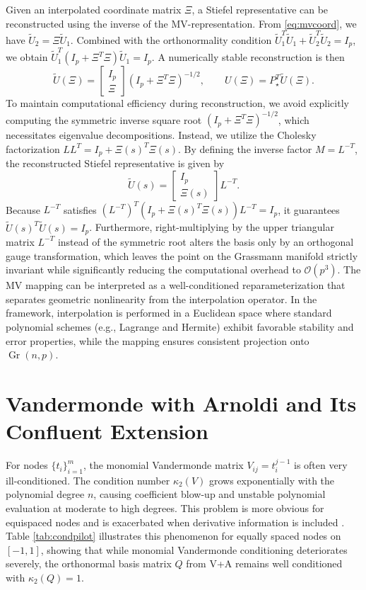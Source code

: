\documentclass[11pt]{article}
\DeclareMathOperator{\Gr}{Gr}
\begin{document}
Given an interpolated coordinate matrix $\Xi$, a Stiefel representative can be reconstructed using the inverse of the MV-representation. From \eqref{eq:mvcoord}, we have $\widetilde U_2 = \Xi \widetilde U_1$. Combined with the orthonormality condition $\widetilde U_1^T \widetilde U_1 + \widetilde U_2^T \widetilde U_2 = I_p$, we obtain $\widetilde U_1^T (I_p + \Xi^T \Xi) \widetilde U_1 = I_p$. A numerically stable reconstruction is then
 $$
\widetilde U(\Xi)=
\begin{bmatrix}I_p\\ \Xi\end{bmatrix}
\left(I_p+\Xi^T\Xi\right)^{-1/2},
\qquad U(\Xi)=P_\star^T\widetilde U(\Xi).
 $$
To maintain computational efficiency during reconstruction, we avoid explicitly computing the symmetric inverse square root $(I_p + \Xi^T \Xi)^{-1/2}$, which necessitates eigenvalue decompositions. Instead, we utilize the Cholesky factorization $L L^T = I_p + \Xi(s)^T \Xi(s)$. By defining the inverse factor $M = L^{-T}$, the reconstructed Stiefel representative is given by
\begin{equation}
    \widetilde U(s) = \begin{bmatrix} I_p \\ \Xi(s) \end{bmatrix} L^{-T}.
\end{equation}
Because $L^{-T}$ satisfies $(L^{-T})^T (I_p + \Xi(s)^T \Xi(s)) L^{-T} = I_p$, it guarantees $\widetilde U(s)^T \widetilde U(s) = I_p$. Furthermore, right-multiplying by the upper triangular matrix $L^{-T}$ instead of the symmetric root alters the basis only by an orthogonal gauge transformation, which leaves the point on the Grassmann manifold strictly invariant while significantly reducing the computational overhead to $\mathcal{O}(p^3)$.
The MV mapping can be interpreted as a well-conditioned reparameterization that separates geometric nonlinearity from the  interpolation operator. In the framework, interpolation is performed in a Euclidean space where standard polynomial schemes (e.g., Lagrange and Hermite) exhibit favorable stability and error properties, while the mapping ensures consistent projection onto $\Gr(n,p)$. 

\section{Vandermonde with Arnoldi and Its Confluent Extension}\label{sec3}
 

For nodes $\{t_i\}_{i=1}^m$, the monomial Vandermonde matrix $V_{ij}=t_i^{j-1}$ is often very ill-conditioned. The condition number $\kappa_2(V)$ grows exponentially with the polynomial degree $n$, causing coefficient blow-up and unstable polynomial evaluation at moderate to high degrees. This problem is more obvious for equispaced nodes and is exacerbated when derivative information is included \cite{brubeck2021vandermonde,higham2002accuracy}. Table \ref{tab:condpilot} illustrates this phenomenon for equally spaced nodes on $[-1,1]$, showing that while monomial Vandermonde conditioning deteriorates severely, the orthonormal basis matrix $Q$ from V+A remains well conditioned with $\kappa_2(Q)=1$.
\end{document}
